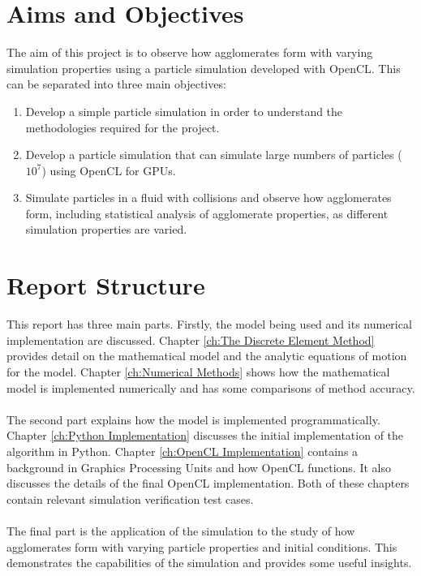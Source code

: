 \documentclass[10pt,a4paper,titlepage]{report}
\begin{document}
\section{Aims and Objectives}
The aim of this project is to observe how agglomerates form with varying simulation properties using a particle simulation developed with OpenCL. This can be separated into three main objectives:
\begin{enumerate}
\item Develop a simple particle simulation in order to understand the methodologies required for the project.
\item Develop a particle simulation that can simulate large numbers of particles ($10^7$) using OpenCL for GPUs.
\item Simulate particles in a fluid with collisions and observe how agglomerates form, including statistical analysis of agglomerate properties, as different simulation properties are varied.
\end{enumerate}
\section{Report Structure}
This report has three main parts. Firstly, the model being used and its numerical implementation are discussed. Chapter \ref{ch:The Discrete Element Method} provides detail on the mathematical model and the analytic equations of motion for the model. Chapter \ref{ch:Numerical Methods} shows how the mathematical model is implemented numerically and has some comparisons of method accuracy.
\\\\The second part explains how the model is implemented programmatically. Chapter \ref{ch:Python Implementation} discusses the initial implementation of the algorithm in Python. Chapter \ref{ch:OpenCL Implementation} contains a background in Graphics Processing Units and how OpenCL functions. It also discusses the details of the final OpenCL implementation. Both of these chapters contain relevant simulation verification test cases.
\\\\The final part is the application of the simulation to the study of how agglomerates form with varying particle properties and initial conditions. This demonstrates the capabilities of the simulation and provides some useful insights.
\end{document}
